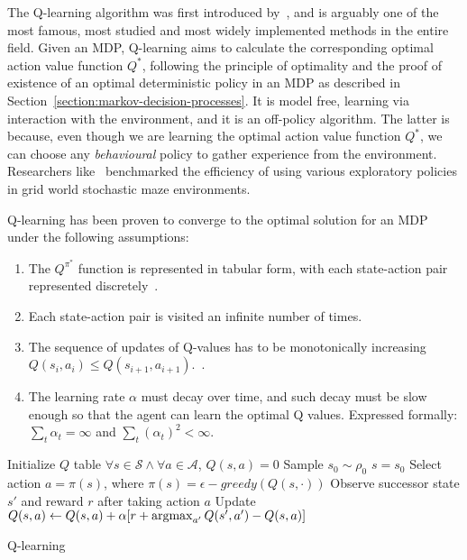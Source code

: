 \documentclass{../main.tex}{}
\begin{document}
The Q-learning algorithm was first introduced by~\cite{Watkins1989}, and is arguably one of the most famous, most studied and most widely implemented methods in the entire field. Given an MDP, Q-learning aims to calculate the corresponding optimal action value function $Q^*$, following the principle of optimality and the proof of existence of an optimal deterministic policy in an MDP as described in Section~\ref{section:markov-decision-processes}. It is model free, learning via interaction with the environment, and it is an off-policy algorithm. The latter is because, even though we are learning the optimal action value function $Q^*$, we can choose any \textit{behavioural} policy to gather experience from the environment. Researchers like~\cite{Tijsma2017} benchmarked the efficiency of using various exploratory policies in grid world stochastic maze environments.

Q-learning has been proven to converge to the optimal solution for an MDP under the following assumptions:
\begin{enumerate}
    \item The $Q^{\pi^*}$ function is represented in tabular form, with each state-action pair represented discretely~\cite{Watkins1992}. 
    \item Each state-action pair is visited an infinite number of times.~\citep{Watkins1989}
    \item The sequence of updates of Q-values has to be monotonically increasing  $Q(s_i, a_i) \leq Q(s_{i+1}, a_{i+1})$.~\citep{Thrun1993}.
    \item The learning rate $\alpha$  must decay over time, and such decay must be slow enough so that the agent can learn the optimal Q values. Expressed formally: $\sum_{t} \alpha_t = \infty$ and $\sum_{t} {(\alpha_{t})}^{2} < \infty$.~\citep{Watkins1989}
\end{enumerate}
  
\begin{algorithm}
    Initialize $Q$ table $\forall s \in \mathcal{S} \wedge \forall a \in \mathcal{A}$, $Q(s,a) = 0$ \;
    Sample $s_0 \sim \rho_0$ \; 
    $s = s_0$ \;
 {
    Select action $a = \pi(s)$, where $\pi(s) = \epsilon-greedy(Q(s, \cdot))$ \;
    Observe successor state $s'$ and reward $r$ after taking action $a$ \;
    Update $Q(s,a) \leftarrow Q(s,a) + \alpha[r + \operatorname*{argmax}_{a'} Q(s', a') - Q(s,a)]$ \;
}
\caption{Q-learning}
\end{algorithm}
\end{document}
